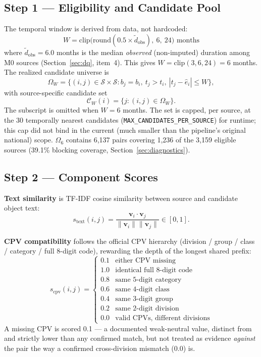 \documentclass[11pt]{article}
\begin{document}
\subsection{Step 1 --- Eligibility and Candidate Pool}
The temporal window is derived from data, not hardcoded:
\begin{equation}
W = \mathrm{clip}\big(\mathrm{round}(0.5 \times \tilde d_{\text{obs}}),\ 6,\ 24\big) \text{ months}
\end{equation}
where $\tilde d_{\text{obs}}=6.0$ months is the median \emph{observed}
(non-imputed) duration among M0 sources (Section~\ref{sec:dq}, item~4).
This gives $W = \mathrm{clip}(3, 6, 24) = 6$ months. The realized candidate
universe is
\begin{equation}
\Omega_W = \big\{(i,j)\in\mathcal{S}\times\mathcal{S} : b_j=b_i,\ t_j>t_i,\ |t_j-\hat e_i|\leq W \big\},
\end{equation}
with source-specific candidate set
\begin{equation}
\mathcal{C}_W(i)=\{j:(i,j)\in\Omega_W\}.
\end{equation}
The subscript is omitted when $W=6$ months. The set is capped, per source,
at the 30 temporally nearest candidates
(\texttt{MAX\_CANDIDATES\_PER\_SOURCE}) for runtime; this cap did not bind
in the current (much smaller than the pipeline's original national) scope.
$\Omega_6$ contains 6{,}137 pairs covering 1{,}236 of the 3{,}159 eligible
sources (39.1\% blocking coverage, Section~\ref{sec:diagnostics}).

\subsection{Step 2 --- Component Scores}
\textbf{Text similarity} is TF-IDF \cite{salton1988} cosine similarity
between source and candidate object text:
\begin{equation}
s_{\text{text}}(i,j) = \frac{\mathbf v_i \cdot \mathbf v_j}{\lVert \mathbf v_i\rVert \lVert \mathbf v_j\rVert} \in [0,1].
\end{equation}

\textbf{CPV compatibility} follows the official CPV hierarchy (division /
group / class / category / full 8-digit code), rewarding the depth of the
longest shared prefix:
\begin{equation}
s_{\text{cpv}}(i,j) =
\begin{cases}
0.1 & \text{either CPV missing} \\
1.0 & \text{identical full 8-digit code} \\
0.8 & \text{same 5-digit category} \\
0.6 & \text{same 4-digit class} \\
0.4 & \text{same 3-digit group} \\
0.2 & \text{same 2-digit division} \\
0.0 & \text{valid CPVs, different divisions}
\end{cases}
\end{equation}
A missing CPV is scored 0.1 --- a documented weak-neutral value, distinct
from and strictly lower than any confirmed match, but not treated as
evidence \emph{against} the pair the way a confirmed cross-division
mismatch (0.0) is.
\end{document}
